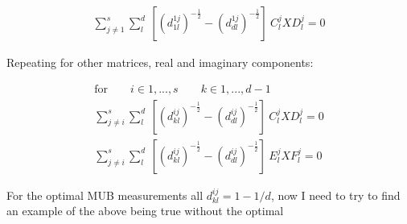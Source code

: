 \documentclass{article}
\begin{document}
\begin{align}
	\sum_{j\ne 1}^s \sum_{l}^d ~ [ (d_{1l}^{1j})^{-\frac{1}{2}} - (d_{dl}^{1j})^{-\frac{1}{2}}] ~ C_l^j X D_l^j = 0
\end{align}

Repeating for other matrices, real and imaginary components:

\begin{align}
	\text{for} \qquad i \in {1,...,s} \qquad k \in {1,...,d-1} \\
	\sum_{j\ne i}^s \sum_{l}^d ~ [ (d_{kl}^{ij})^{-\frac{1}{2}} - (d_{dl}^{ij})^{-\frac{1}{2}}] ~ C_l^j X D_l^j = 0 \\
	\sum_{j\ne i}^s \sum_{l}^d ~ [ (d_{kl}^{ij})^{-\frac{1}{2}} - (d_{dl}^{ij})^{-\frac{1}{2}}] ~ E_l^j X F_l^j = 0
\end{align}

For the optimal MUB measurements all $d_{kl}^{ij} = 1-1/d$, now I need to try to find an example of the above being true without the optimal
\end{document}
